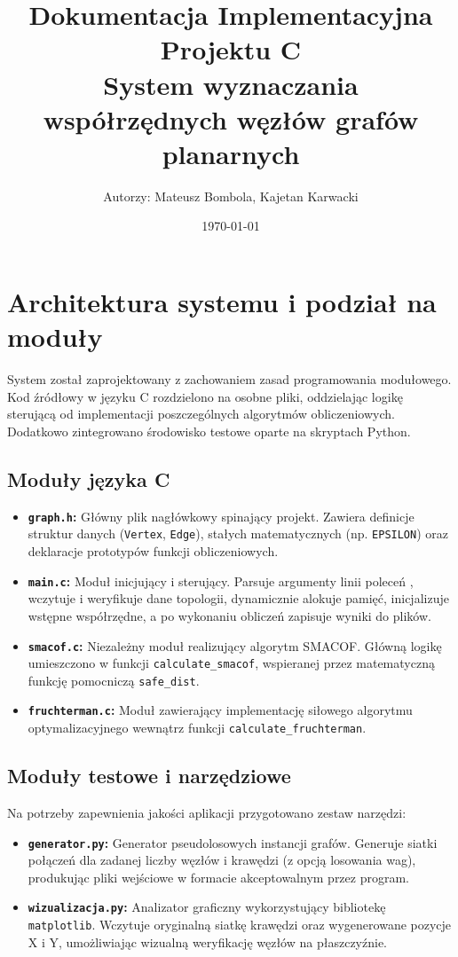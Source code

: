 \documentclass[12pt,a4paper]{article}
\title{Dokumentacja Implementacyjna Projektu C\\ \large System wyznaczania współrzędnych węzłów grafów planarnych}
\author{Autorzy: Mateusz Bombola, Kajetan Karwacki}
\date{\today}
\begin{document}
\maketitle
\newpage
\tableofcontents
\newpage

\section{Architektura systemu i podział na moduły}
System został zaprojektowany z zachowaniem zasad programowania modułowego. Kod źródłowy w języku C rozdzielono na osobne pliki, oddzielając logikę sterującą od implementacji poszczególnych algorytmów obliczeniowych. Dodatkowo zintegrowano środowisko testowe oparte na skryptach Python.

\subsection{Moduły języka C}
\begin{itemize}
    \item \textbf{\texttt{graph.h}:} Główny plik nagłówkowy spinający projekt. Zawiera definicje struktur danych (\texttt{Vertex}, \texttt{Edge}), stałych matematycznych (np. \texttt{EPSILON}) oraz deklaracje prototypów funkcji obliczeniowych.
    
    \item \textbf{\texttt{main.c}:} Moduł inicjujący i sterujący. Parsuje argumenty linii poleceń , wczytuje i weryfikuje dane topologii, dynamicznie alokuje pamięć, inicjalizuje wstępne współrzędne, a po wykonaniu obliczeń zapisuje wyniki do plików.
    
    \item \textbf{\texttt{smacof.c}:} Niezależny moduł realizujący algorytm SMACOF. Główną logikę umieszczono w funkcji \texttt{calculate\_smacof}, wspieranej przez matematyczną funkcję pomocniczą \texttt{safe\_dist}.
    
    \item \textbf{\texttt{fruchterman.c}:} Moduł zawierający implementację siłowego algorytmu optymalizacyjnego wewnątrz funkcji \texttt{calculate\_fruchterman}.
\end{itemize}

\subsection{Moduły testowe i narzędziowe}
Na potrzeby zapewnienia jakości aplikacji przygotowano zestaw narzędzi:
\begin{itemize}
    \item \textbf{\texttt{generator.py}:} Generator pseudolosowych instancji grafów. Generuje siatki połączeń dla zadanej liczby węzłów i krawędzi (z opcją losowania wag), produkując pliki wejściowe w formacie akceptowalnym przez program.
    \item \textbf{\texttt{wizualizacja.py}:} Analizator graficzny wykorzystujący bibliotekę \texttt{matplotlib}. Wczytuje oryginalną siatkę krawędzi oraz wygenerowane pozycje X i Y, umożliwiając wizualną weryfikację węzłów na płaszczyźnie.
\end{itemize}
\end{document}
